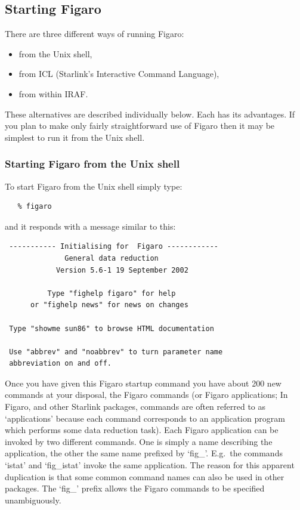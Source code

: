 
\subsection{\label{starting}Starting Figaro}

There are three different ways of running Figaro:

\begin{itemize}

  \item from the Unix shell,

  \item from ICL (Starlink's Interactive Command Language),

  \item from within IRAF.

\end{itemize}

These alternatives are described individually below.  Each has its
advantages.  If you plan to make only fairly straightforward use of
Figaro then it may be simplest to run it from the Unix shell.

\subsubsection{Starting Figaro from the Unix shell}

To start Figaro from the Unix shell simply type:

\begin{verbatim}
   % figaro
\end{verbatim}

   and it responds with a message similar to this:

\begin{verbatim}
 ----------- Initialising for  Figaro ------------
              General data reduction
            Version 5.6-1 19 September 2002
 
          Type "fighelp figaro" for help
      or "fighelp news" for news on changes
 
 Type "showme sun86" to browse HTML documentation
 
 Use "abbrev" and "noabbrev" to turn parameter name
 abbreviation on and off.
\end{verbatim}

   Once you have given this Figaro startup command you have about 200
   new commands at your disposal, the Figaro commands (or Figaro
   applications; In Figaro, and other Starlink packages, commands are
   often referred to as `applications' because each command corresponds
   to an application program which performs some data reduction task).
   Each Figaro application can be invoked by two different commands.
   One is simply a name describing the application, the other the same
   name prefixed by `fig\_'.  E.g.\ the commands `istat' and `fig\_istat'
   invoke the same application.  The reason for this apparent duplication
   is that some common command names can also be used in other packages.
   The `fig\_' prefix allows the Figaro commands to be specified
   unambiguously.

